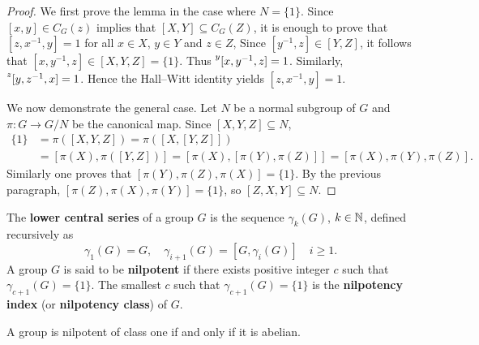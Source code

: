\begin{proof}
	We first prove the lemma in the case where $N=\{1\}$. 	Since $[x,y]\in C_G(z)$ implies that 
	$[X,Y]\subseteq C_G(Z)$, it
	is enough to prove that $[z,x^{-1},y]=1$ for all $x\in X$, $y\in Y$ and $z\in Z$, 
	Since $[y^{-1},z]\in [Y,Z]$, it follows that 
	$[x,y^{-1},z]\in [X,Y,Z]=\{1\}$. Thus $\prescript{y}{}[x,y^{-1},z]=1$.
	Similarly, $\prescript{z}{}[y,z^{-1},x]=1$. Hence the 
	Hall--Witt identity yields 
	$[z,x^{-1},y]=1$.

	We now demonstrate the general case. Let $N$ be a normal subgroup of $G$ 
	and $\pi\colon G\to G/N$ be the canonical map. Since $[X,Y,Z]\subseteq N$, 
	\begin{align*}
		\{1\}&=\pi([X,Y,Z])=\pi([ X,[Y,Z]])\\
		&=[\pi(X),\pi([Y,Z])]=[ \pi(X),[\pi(Y),\pi(Z)]]=[\pi(X),\pi(Y),\pi(Z)]. 
	\end{align*}
	Similarly one proves that $[\pi(Y),\pi(Z),\pi(X)]=\{1\}$. By the previous paragraph,  
	$[\pi(Z),\pi(X),\pi(Y)]=\{1\}$, so $[Z,X,Y]\subseteq N$.
\end{proof}

The \textbf{lower central series} of a group $G$ is 
the sequence $\gamma_k(G)$, $k\in\mathbb{N}$, 
defined recursively as 
\[
		\gamma_1(G)=G,\quad
		\gamma_{i+1}(G)=[G,\gamma_i(G)]\quad i\geq 1.
\]
A group $G$ is said to be \textbf{nilpotent} if there exists positive integer $c$ such that 
$\gamma_{c+1}(G)=\{1\}$. The smallest $c$ such that $\gamma_{c+1}(G)=\{1\}$ is
the \textbf{nilpotency index} (or \textbf{nilpotency class}) of $G$. 


\begin{example}
	A group is nilpotent of class one if and only if it is abelian.  
\end{example}


